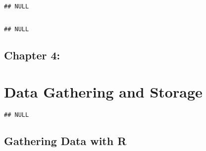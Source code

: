 \documentclass[ChapterTOCs,krantz1]{krantz}\usepackage{graphicx, color}
\makeatletter
\newenvironment{kframe}{%
 \def\at@end@of@kframe{}%
 \ifinner\ifhmode%
  \def\at@end@of@kframe{\end{minipage}}%
  \begin{minipage}{\columnwidth}%
 \fi\fi%
 \def\FrameCommand##1{\hskip\@totalleftmargin \hskip-\fboxsep
 \colorbox{shadecolor}{##1}\hskip-\fboxsep
     \hskip-\linewidth \hskip-\@totalleftmargin \hskip\columnwidth}%
 \MakeFramed {\advance\hsize-\width
   \@totalleftmargin\z@ \linewidth\hsize
   \@setminipage}}%
 {\par\unskip\endMakeFramed%
 \at@end@of@kframe}
\newenvironment{knitrout}{}{} %
\makeatother
\begin{document}

\begin{knitrout}
\color{fgcolor}\begin{kframe}
\begin{verbatim}
## NULL
\end{verbatim}
\end{kframe}
\end{knitrout}


\chapter{}

\begin{knitrout}
\color{fgcolor}\begin{kframe}
\begin{verbatim}
## NULL
\end{verbatim}
\end{kframe}
\end{knitrout}


\chapter{Chapter 4:}


\part{Data Gathering and Storage}


\begin{knitrout}
\color{fgcolor}\begin{kframe}
\begin{verbatim}
## NULL
\end{verbatim}
\end{kframe}
\end{knitrout}


\chapter{Gathering Data with R}
\end{document}
